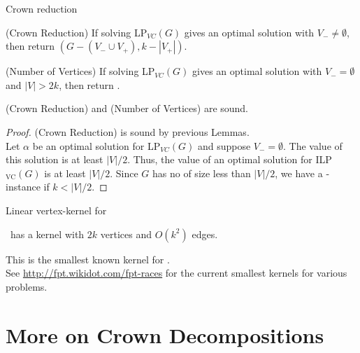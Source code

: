 \begin{frame}{Crown reduction}
 \begin{block}{(Crown Reduction)}
  If solving LP$_{VC}(G)$ gives an optimal solution with $V_-\ne \emptyset$, then return $(G- (V_-\cup V_+), k-|V_+|)$.
 \end{block}
 
 \pause
 \begin{block}{(Number of Vertices)}
  If solving LP$_{VC}(G)$ gives an optimal solution with $V_- = \emptyset$ and $|V|>2k$, then return \No.
 \end{block}

 \pause
 \begin{lemma}
  (Crown Reduction) and (Number of Vertices) are sound.
 \end{lemma}
 \begin{proof}
  (Crown Reduction) is sound by previous Lemmas.\\
  Let $\alpha$ be an optimal solution for LP$_{VC}(G)$ and suppose $V_- = \emptyset$. The value of this solution is at least $|V|/2$.
  Thus, the value of an optimal solution for ILP$_{\text{VC}}(G)$ is at least $|V|/2$.
  Since $G$ has no \vc of size less than $|V|/2$, we have a \No-instance if $k<|V|/2$.
 \end{proof}

\end{frame}


\begin{frame}{Linear vertex-kernel for \VC}

 \begin{theorem}
  \VC\ has a kernel with $2k$ vertices and $O(k^2)$ edges.
 \end{theorem}
 
 This is the smallest known kernel for \VC.\\
 See \url{http://fpt.wikidot.com/fpt-races} for the current smallest kernels for various problems.

\end{frame}



\section{More on Crown Decompositions}

